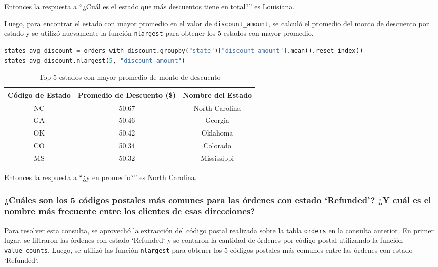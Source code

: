 Entonces la respuesta a ``¿Cuál es el estado que más descuentos tiene en total?'' es Louisiana.

Luego, para encontrar el estado con mayor promedio en el valor de \texttt{discount\_amount}, se calculó el promedio del monto de descuento por estado y se utilizó nuevamente la función \texttt{nlargest} para obtener los 5 estados con mayor promedio.

\begin{lstlisting}[language=Python, xleftmargin=26pt, xrightmargin=26pt]
states_avg_discount = orders_with_discount.groupby("state")["discount_amount"].mean().reset_index()
states_avg_discount.nlargest(5, "discount_amount")
\end{lstlisting}

\begin{table}[H]
\centering
\begin{tabular}{|c|c|c|}
\hline
\textbf{Código de Estado} & \textbf{Promedio de Descuento (\$)} & \textbf{Nombre del Estado} \\
\hline
NC & 50.67 & North Carolina \\
GA & 50.46 & Georgia \\
OK & 50.42 & Oklahoma \\
CO & 50.34 & Colorado \\
MS & 50.32 & Mississippi \\
\hline
\end{tabular}
\caption{Top 5 estados con mayor promedio de monto de descuento}
\end{table}

Entonces la respuesta a ``¿y en promedio?'' es North Carolina.

\subsubsection{¿Cuáles son los 5 códigos postales más comunes para las órdenes con estado `Refunded'? ¿Y cuál es el nombre más frecuente entre los clientes de esas direcciones?}

Para resolver esta consulta, se aprovechó la extracción del código postal realizada sobre la tabla \texttt{orders} en la consulta anterior. 
En primer lugar, se filtraron las órdenes con estado `Refunded` y se contaron la cantidad de órdenes por código postal utilizando la función \texttt{value\_counts}. Luego, se utilizó las función \texttt{nlargest} para obtener los 5 códigos postales más comunes entre las órdenes con estado `Refunded`.

